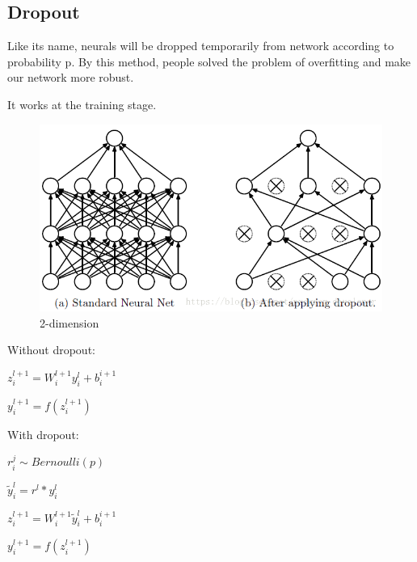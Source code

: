 \documentclass{article} %
\begin{document}
\subsection{Dropout}
Like its name, neurals will be dropped temporarily from network according to probability p. By this method, people solved the problem of overfitting and make our network more robust.

It works at the training stage.

\begin{figure}[h]
	\centering  %
	\includegraphics[width=.4\textwidth]{1.png} 
	\caption{2-dimension}  %
	\label{fig:f1}   %
\end{figure}

Without dropout:
\begin{center}
${\displaystyle z_i^{l+1}=W_i^{l+1}y_i^l+b_i^{i+1}}$

${\displaystyle	y_i^{l+1}=f(z_i^{l+1})}$
\end{center}
With dropout:
\begin{center}
${\displaystyle r_i^j \sim Bernoulli(p)}$

${\displaystyle \tilde{y}_i^{l} = r^l*y_i^l}$

${\displaystyle z_i^{l+1}=W_i^{l+1}\tilde{y}_i^l+b_i^{i+1}}$

${\displaystyle y_i^{l+1}=f(z_i^{l+1})}$
\end{center}
\end{document}
